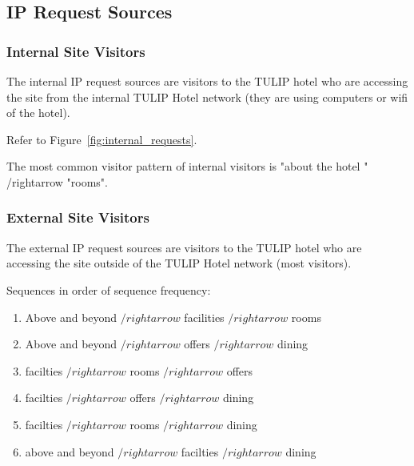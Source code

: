 \subsection{IP Request Sources}
\label{sec:results:ip_source}


\subsubsection{Internal Site Visitors}

The internal IP request sources are visitors to the TULIP hotel who are accessing the site from the internal TULIP Hotel network (they are using computers or wifi of the hotel).

\label{sec:results:ip_source:internal}

Refer to Figure~\ref{fig:internal_requests}.

The most common visitor pattern of internal visitors is "about the hotel " /rightarrow "rooms".


\subsubsection{External Site Visitors}

The external IP request sources are visitors to the TULIP hotel who are accessing the site outside of the TULIP Hotel network (most visitors).

\label{sec:results:ip_source:external}

Sequences in order of sequence frequency:
\begin{enumerate}
  \item Above and beyond $/rightarrow$ facilities $/rightarrow$ rooms
  \item Above and beyond $/rightarrow$ offers $/rightarrow$ dining
  \item facilties $/rightarrow$ rooms $/rightarrow$ offers
  \item facilties $/rightarrow$ offers $/rightarrow$ dining
  \item facilties $/rightarrow$ rooms $/rightarrow$ dining 
  \item above and beyond $/rightarrow$ facilties $/rightarrow$ dining
\end{enumerate}

